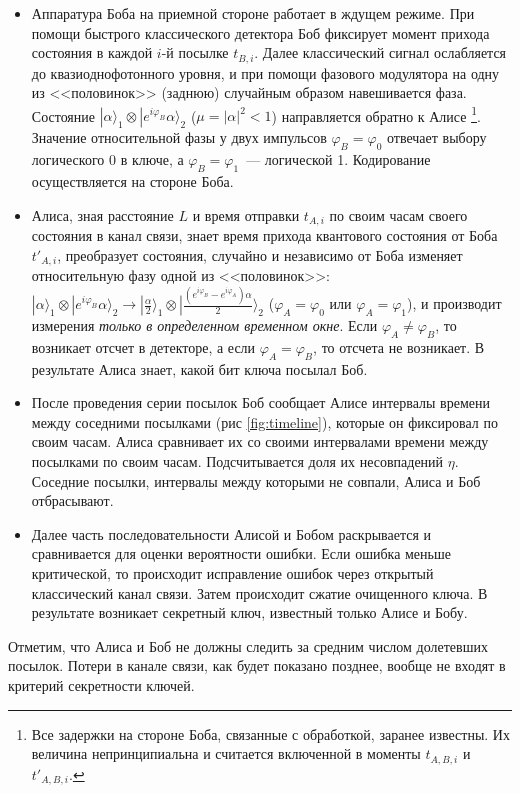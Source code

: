 \begin{itemize}
  \item Аппаратура Боба на приемной стороне работает в ждущем режиме. При помощи быстрого классического детектора Боб фиксирует момент прихода состояния в каждой $i$-й посылке $t_{B,i}$. 
  Далее классический сигнал ослабляется до квазиоднофотонного уровня, и при помощи фазового модулятора на одну из <<половинок>> (заднюю) случайным образом навешивается фаза. 
  Состояние $|\alpha\rangle_1 \otimes |e^{i\varphi_B}\alpha\rangle_2$ ($\mu = |\alpha|^2 < 1$) направляется обратно к Алисе 
  \footnote{Все задержки на стороне Боба, связанные с обработкой, заранее известны. Их величина непринципиальна и считается включенной в моменты $t_{A,B,i}$ и $t'_{A,B,i}$.}. 
  Значение относительной фазы у двух импульсов $\varphi_B = \varphi_0$ отвечает выбору логического 0 в ключе, а $\varphi_B = \varphi_1$~--- логической 1. 
  Кодирование осуществляется на стороне Боба.
  
  \item Алиса, зная расстояние $L$ и время отправки $t_{A,i}$ по своим часам своего состояния в канал связи, знает время прихода квантового состояния от Боба $t'_{A,i}$, преобразует состояния, случайно и независимо от Боба изменяет относительную фазу одной из <<половинок>>: 
  $|\alpha\rangle_1 \otimes |e^{i\varphi_B}\alpha\rangle_2 \rightarrow |\frac{\alpha}{2}\rangle_1 \otimes |\frac{(e^{i\varphi_B} - e^{i\varphi_A})\alpha}{2}\rangle_2$
  ($\varphi_A = \varphi_0$ или $\varphi_A = \varphi_1$), и производит измерения \textit{только в определенном временном окне}. 
  Если $\varphi_A \neq \varphi_B$, то возникает отсчет в детекторе, а если $\varphi_A = \varphi_B$, то отсчета не возникает. В результате Алиса знает, какой бит ключа посылал Боб.
  
  \item После проведения серии посылок Боб сообщает Алисе интервалы времени между соседними посылками (рис \ref{fig:timeline}), которые он фиксировал по своим часам. Алиса сравнивает их со своими интервалами времени между посылками по своим часам. Подсчитывается доля их несовпадений $\eta$. Соседние посылки, интервалы между которыми не совпали, Алиса и Боб отбрасывают.
  
  \item Далее часть последовательности Алисой и Бобом раскрывается и сравнивается для оценки вероятности ошибки. Если ошибка меньше критической, то происходит исправление ошибок через открытый классический канал связи. Затем происходит сжатие очищенного ключа. В результате возникает секретный ключ, известный только Алисе и Бобу.
\end{itemize}

Отметим, что Алиса и Боб не должны следить за средним числом долетевших посылок. Потери в канале связи, как будет показано позднее, вообще не входят в критерий секретности ключей.
\clearpage